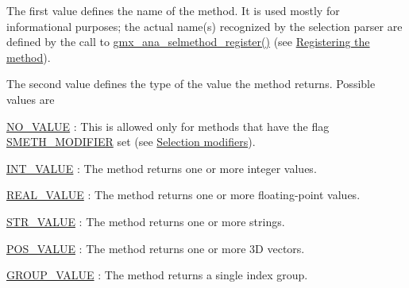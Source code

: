 \-The first value defines the name of the method. \-It is used mostly for informational purposes; the actual name(s) recognized by the selection parser are defined by the call to \hyperlink{include_2selmethod_8h_a820231622b6b4dd57fba7570f705498f}{gmx\-\_\-ana\-\_\-selmethod\-\_\-register()} (see \hyperlink{selmethods_selmethods_register}{\-Registering the method}).

\-The second value defines the type of the value the method returns. \-Possible values are
\begin{DoxyItemize}
\item \hyperlink{share_2template_2gromacs_2selvalue_8h_a70b42b87d434580bf1493591857b8beca4d694119ce83b62d74ff06b5e017dca8}{\-N\-O\-\_\-\-V\-A\-L\-U\-E} \-: \-This is allowed only for methods that have the flag \hyperlink{share_2template_2gromacs_2selmethod_8h_aa5b18df47b72690889afd89f5e68694c}{\-S\-M\-E\-T\-H\-\_\-\-M\-O\-D\-I\-F\-I\-E\-R} set (see \hyperlink{selmethods_selmethods_modifiers}{\-Selection modifiers}).
\item \hyperlink{share_2template_2gromacs_2selvalue_8h_a70b42b87d434580bf1493591857b8becacd1ce0b084595a6072a57781dc7738a0}{\-I\-N\-T\-\_\-\-V\-A\-L\-U\-E} \-: \-The method returns one or more integer values.
\item \hyperlink{share_2template_2gromacs_2selvalue_8h_a70b42b87d434580bf1493591857b8beca7aa9587044cd6fd9c1f1690719a072cf}{\-R\-E\-A\-L\-\_\-\-V\-A\-L\-U\-E} \-: \-The method returns one or more floating-\/point values.
\item \hyperlink{share_2template_2gromacs_2selvalue_8h_a70b42b87d434580bf1493591857b8beca6f2f1fe9592d96990c9ac690c355bd08}{\-S\-T\-R\-\_\-\-V\-A\-L\-U\-E} \-: \-The method returns one or more strings.
\item \hyperlink{share_2template_2gromacs_2selvalue_8h_a70b42b87d434580bf1493591857b8beca31a47fbfbc85ad1472ce3d2a168fd1ec}{\-P\-O\-S\-\_\-\-V\-A\-L\-U\-E} \-: \-The method returns one or more 3\-D vectors.
\item \hyperlink{share_2template_2gromacs_2selvalue_8h_a70b42b87d434580bf1493591857b8beca70a2af6eafa48adfab506ceee60471f6}{\-G\-R\-O\-U\-P\-\_\-\-V\-A\-L\-U\-E} \-: \-The method returns a single index group.
\end{DoxyItemize}

